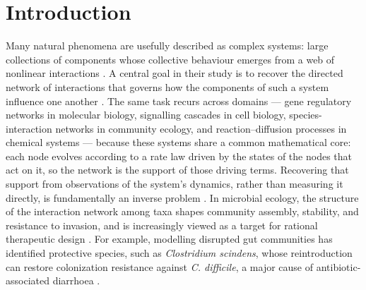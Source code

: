 \section{Introduction}
\label{sec:intro}

Many natural phenomena are usefully described as complex systems: large collections of
components whose collective behaviour emerges from a web of nonlinear interactions
\citep{strogatz2001exploring,barzel2013universality}. A central goal in their study is
to recover the directed network of interactions that governs how the components of such
a system influence one another \citep{barzel2013universality}. The same task recurs
across domains --- gene regulatory networks in molecular biology, signalling cascades in
cell biology, species-interaction networks in community ecology, and reaction--diffusion
processes in chemical systems \citep{timme2014revealing,turing1952chemical} --- because
these systems share a common mathematical core: each node evolves according to a rate
law driven by the states of the nodes that act on it, so the network is the support of
those driving terms. Recovering that support from observations of the system's dynamics,
rather than measuring it directly, is fundamentally an inverse problem
\citep{timme2014revealing,gao2022autonomous}. In microbial ecology, the
structure of the interaction network among taxa shapes community assembly, stability,
and resistance to invasion, and is increasingly viewed as a target for rational
therapeutic design \citep{clark2021design,ishizawa2024beyond}. For example,
modelling disrupted gut communities has identified protective species, such as
\textit{Clostridium scindens}, whose reintroduction can restore colonization resistance
against \textit{C. difficile}, a major cause of antibiotic-associated diarrhoea
\citep{buffie2015precision}.

